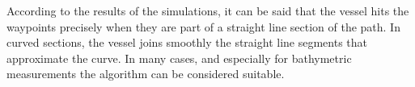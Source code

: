 According to the results of the simulations, it can be said that the vessel hits the waypoints precisely when they are part of a straight line section of the path. In curved sections, the vessel joins smoothly the straight line segments that approximate the curve. In many cases, and especially for bathymetric measurements the algorithm can be considered suitable.

	



